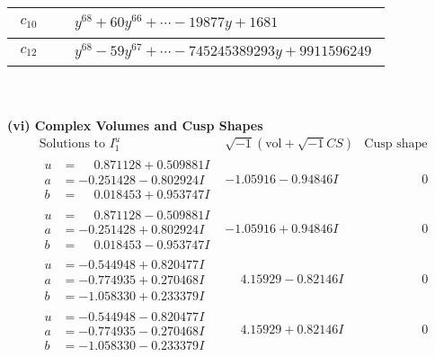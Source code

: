 \documentclass[1p]{elsarticle_modified}
\theoremstyle{definition}
\newcommand{\I}{\sqrt{-1}}
\begin{document}
\begin{tabular}{m{50pt}|m{274pt}}
\hline $$\begin{aligned}c_{10}\end{aligned}$$&$\begin{aligned}
&y^{68}+60 y^{66}+\cdots-19877 y+1681
\end{aligned}$\\
\hline $$\begin{aligned}c_{12}\end{aligned}$$&$\begin{aligned}
&y^{68}-59 y^{67}+\cdots-745245389293 y+9911596249
\end{aligned}$\\
\hline
\end{tabular}\\~\\
\newpage\flushleft \textbf{(vi) Complex Volumes and Cusp Shapes}
$$\begin{array}{c|c|c}  
\text{Solutions to }I^u_{1}& \I (\text{vol} + \sqrt{-1}CS) & \text{Cusp shape}\\
 \hline 
\begin{aligned}
u &= \phantom{-}0.871128 + 0.509881 I \\
a &= -0.251428 - 0.802924 I \\
b &= \phantom{-}0.018453 + 0.953747 I\end{aligned}
 & -1.05916 - 0.94846 I & \phantom{-0.000000 } 0 \\ \hline\begin{aligned}
u &= \phantom{-}0.871128 - 0.509881 I \\
a &= -0.251428 + 0.802924 I \\
b &= \phantom{-}0.018453 - 0.953747 I\end{aligned}
 & -1.05916 + 0.94846 I & \phantom{-0.000000 } 0 \\ \hline\begin{aligned}
u &= -0.544948 + 0.820477 I \\
a &= -0.774935 + 0.270468 I \\
b &= -1.058330 + 0.233379 I\end{aligned}
 & \phantom{-}4.15929 - 0.82146 I & \phantom{-0.000000 } 0 \\ \hline\begin{aligned}
u &= -0.544948 - 0.820477 I \\
a &= -0.774935 - 0.270468 I \\
b &= -1.058330 - 0.233379 I\end{aligned}
 & \phantom{-}4.15929 + 0.82146 I & \phantom{-0.000000 } 0 \\ \hline\begin{aligned}

\end{aligned}
\end{array}$$
\end{document}
